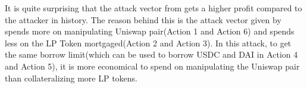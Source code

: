 It is quite surprising that the attack vector from {\name} gets a higher profit compared to the attacker in history. The reason behind this is the attack vector given by {\name} spends more on manipulating Uniswap pair(Action 1 and Action 6) and spends less on the LP Token mortgaged(Action 2 and Action 3). In this attack, to get the same borrow limit(which can be used to borrow USDC and DAI in Action 4 and Action 5), it is more economical to spend on manipulating the Uniswap pair than collateralizing more LP tokens. 


